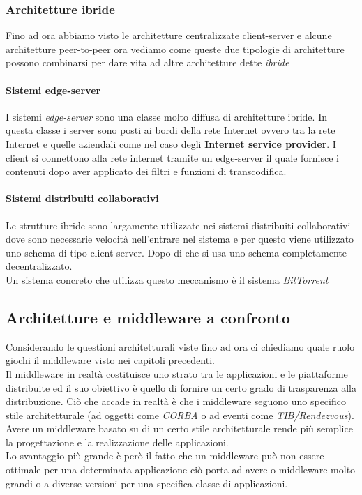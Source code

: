\subsubsection{Architetture ibride}
Fino ad ora abbiamo visto le architetture centralizzate client-server e alcune architetture peer-to-peer ora vediamo come queste due tipologie di architetture possono combinarsi per dare vita ad altre architetture dette \emph{ibride}
\paragraph{Sistemi edge-server}
I sistemi \emph{edge-server} sono una classe molto diffusa di architetture ibride. In questa classe i server sono posti ai bordi della rete Internet ovvero tra la rete Internet e quelle aziendali come nel caso degli \textbf{Internet service provider}. I client si connettono alla rete internet tramite un edge-server il quale fornisce i contenuti dopo aver applicato dei filtri e funzioni di transcodifica.
\paragraph{Sistemi distribuiti collaborativi}
Le strutture ibride sono largamente utilizzate nei sistemi distribuiti collaborativi dove sono necessarie velocità nell'entrare nel sistema e per questo viene utilizzato uno schema di tipo client-server. Dopo di che si usa uno schema completamente decentralizzato.\\
Un sistema concreto che utilizza questo meccanismo è il sistema \emph{BitTorrent}
\subsection{Architetture e middleware a confronto}
Considerando le questioni architetturali viste fino ad ora ci chiediamo quale ruolo giochi il middleware visto nei capitoli precedenti.\\
Il middleware in realtà costituisce uno strato tra le applicazioni e le piattaforme distribuite ed il suo obiettivo è quello di fornire un certo grado di trasparenza alla distribuzione. Ciò che accade in realtà è che i middleware seguono uno specifico stile architetturale (ad oggetti come \emph{CORBA} o ad eventi come \emph{TIB/Rendezvous}). Avere un middleware basato su di un certo stile architetturale rende più semplice la progettazione e la realizzazione delle applicazioni.\\
Lo svantaggio più grande è però il fatto che un middleware può  non essere ottimale per una determinata applicazione ciò porta ad avere o middleware molto grandi o a diverse versioni per una specifica classe di applicazioni.
